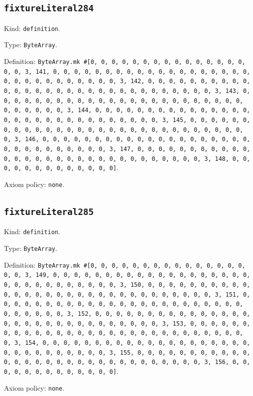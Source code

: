 \documentclass[11pt]{article}
\begin{document}
\subsection*{\texttt{fixtureLiteral284}}
\noindent Kind: \texttt{definition}.\par
\noindent Type: \texttt{ByteArray}.\par
\noindent Definition: \texttt{ByteArray.mk \#[0, 0, 0, 0, 0, 0, 0, 0, 0, 0, 0, 0, 0, 0, 0, 0, 0, 3, 141, 0, 0, 0, 0, 0, 0, 0, 0, 0, 0, 0, 0, 0, 0, 0, 0, 0, 0, 0, 0, 0, 0, 0, 0, 0, 0, 0, 0, 0, 0, 3, 142, 0, 0, 0, 0, 0, 0, 0, 0, 0, 0, 0, 0, 0, 0, 0, 0, 0, 0, 0, 0, 0, 0, 0, 0, 0, 0, 0, 0, 0, 0, 3, 143, 0, 0, 0, 0, 0, 0, 0, 0, 0, 0, 0, 0, 0, 0, 0, 0, 0, 0, 0, 0, 0, 0, 0, 0, 0, 0, 0, 0, 0, 0, 3, 144, 0, 0, 0, 0, 0, 0, 0, 0, 0, 0, 0, 0, 0, 0, 0, 0, 0, 0, 0, 0, 0, 0, 0, 0, 0, 0, 0, 0, 0, 0, 3, 145, 0, 0, 0, 0, 0, 0, 0, 0, 0, 0, 0, 0, 0, 0, 0, 0, 0, 0, 0, 0, 0, 0, 0, 0, 0, 0, 0, 0, 0, 0, 3, 146, 0, 0, 0, 0, 0, 0, 0, 0, 0, 0, 0, 0, 0, 0, 0, 0, 0, 0, 0, 0, 0, 0, 0, 0, 0, 0, 0, 0, 0, 0, 3, 147, 0, 0, 0, 0, 0, 0, 0, 0, 0, 0, 0, 0, 0, 0, 0, 0, 0, 0, 0, 0, 0, 0, 0, 0, 0, 0, 0, 0, 0, 0, 3, 148, 0, 0, 0, 0, 0, 0, 0, 0, 0, 0, 0, 0, 0]}.\par
\noindent Axiom policy: \texttt{none}.\par
\subsection*{\texttt{fixtureLiteral285}}
\noindent Kind: \texttt{definition}.\par
\noindent Type: \texttt{ByteArray}.\par
\noindent Definition: \texttt{ByteArray.mk \#[0, 0, 0, 0, 0, 0, 0, 0, 0, 0, 0, 0, 0, 0, 0, 0, 0, 3, 149, 0, 0, 0, 0, 0, 0, 0, 0, 0, 0, 0, 0, 0, 0, 0, 0, 0, 0, 0, 0, 0, 0, 0, 0, 0, 0, 0, 0, 0, 0, 3, 150, 0, 0, 0, 0, 0, 0, 0, 0, 0, 0, 0, 0, 0, 0, 0, 0, 0, 0, 0, 0, 0, 0, 0, 0, 0, 0, 0, 0, 0, 0, 3, 151, 0, 0, 0, 0, 0, 0, 0, 0, 0, 0, 0, 0, 0, 0, 0, 0, 0, 0, 0, 0, 0, 0, 0, 0, 0, 0, 0, 0, 0, 0, 3, 152, 0, 0, 0, 0, 0, 0, 0, 0, 0, 0, 0, 0, 0, 0, 0, 0, 0, 0, 0, 0, 0, 0, 0, 0, 0, 0, 0, 0, 0, 0, 3, 153, 0, 0, 0, 0, 0, 0, 0, 0, 0, 0, 0, 0, 0, 0, 0, 0, 0, 0, 0, 0, 0, 0, 0, 0, 0, 0, 0, 0, 0, 0, 3, 154, 0, 0, 0, 0, 0, 0, 0, 0, 0, 0, 0, 0, 0, 0, 0, 0, 0, 0, 0, 0, 0, 0, 0, 0, 0, 0, 0, 0, 0, 0, 3, 155, 0, 0, 0, 0, 0, 0, 0, 0, 0, 0, 0, 0, 0, 0, 0, 0, 0, 0, 0, 0, 0, 0, 0, 0, 0, 0, 0, 0, 0, 0, 3, 156, 0, 0, 0, 0, 0, 0, 0, 0, 0, 0, 0, 0, 0]}.\par
\noindent Axiom policy: \texttt{none}.\par
\end{document}
